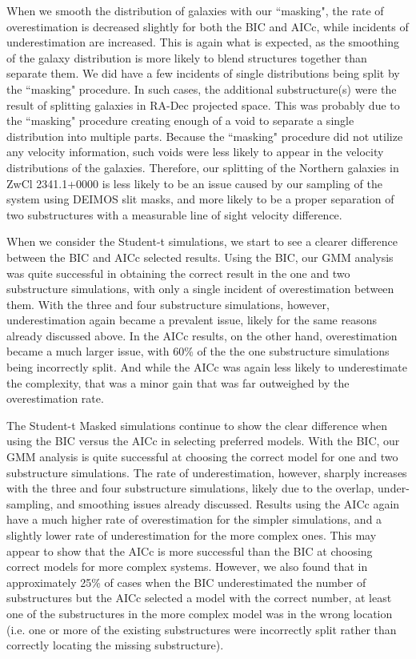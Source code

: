 \documentclass[onecolumn]{aastex}
\begin{document}
When we smooth the distribution of galaxies with our ``masking", the rate of overestimation is decreased slightly for both the BIC and AICc, while incidents of underestimation are increased.  This is again what is expected, as the smoothing of the galaxy distribution is more likely to blend structures together than separate them.  We did have a few incidents of single distributions being split by the ``masking" procedure.  In such cases, the additional substructure(s) were the result of splitting galaxies in RA-Dec projected space.  This was probably due to the ``masking" procedure creating enough of a void to separate a single distribution into multiple parts.  Because the ``masking" procedure did not utilize any velocity information, such voids were less likely to appear in the velocity distributions of the galaxies.  Therefore, our splitting of the Northern galaxies in ZwCl 2341.1+0000 is less likely to be an issue caused by our sampling of the system using DEIMOS slit masks, and more likely to be a proper separation of two substructures with a measurable line of sight velocity difference.

When we consider the Student-t simulations, we start to see a clearer difference between the BIC and AICc selected results.  Using the BIC, our GMM analysis was quite successful in obtaining the correct result in the one and two substructure simulations, with only a single incident of overestimation between them.  With the three and four substructure simulations, however, underestimation again became a prevalent issue, likely for the same reasons already discussed above.  In the AICc results, on the other hand, overestimation became a much larger issue, with 60\% of the the one substructure simulations being incorrectly split.  And while the AICc was again less likely to underestimate the complexity, that was a minor gain that was far outweighed by the overestimation rate.

The Student-t Masked simulations continue to show the clear difference when using the BIC versus the AICc in selecting preferred models.  With the BIC, our GMM analysis is quite successful at choosing the correct model for one and two substructure simulations.  The rate of underestimation, however, sharply increases with the three and four substructure simulations, likely due to the overlap, under-sampling, and smoothing issues already discussed.  Results using the AICc again have a much higher rate of overestimation for the simpler simulations, and a slightly lower rate of underestimation for the more complex ones.  This may appear to show that the AICc is more successful than the BIC at choosing correct models for more complex systems.  However, we also found that in approximately 25\% of cases when the BIC underestimated the number of substructures but the AICc selected a model with the correct number, at least one of the substructures in the more complex model was in the wrong location (i.e. one or more of the existing substructures were incorrectly split rather than correctly locating the missing substructure).
\end{document}
